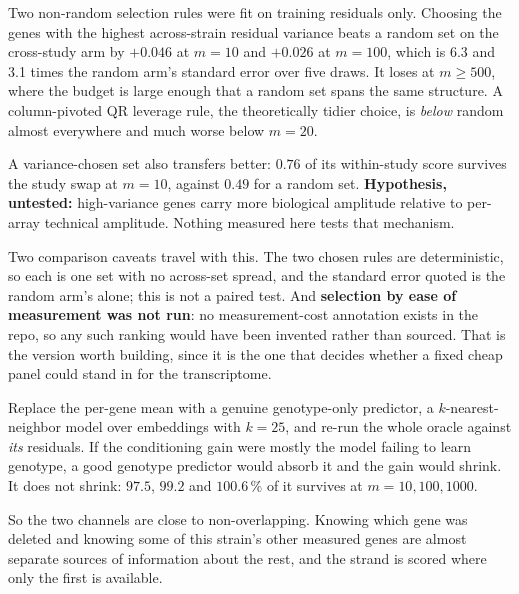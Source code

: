  Two
non-random selection rules were fit on training residuals only. Choosing the genes with the
highest across-strain residual variance beats a random set on the cross-study arm by
$+0.046$ at $m = 10$ and $+0.026$ at $m = 100$, which is 6.3 and 3.1 times the random arm's
standard error over five draws. It loses at $m \ge 500$, where the budget is large enough
that a random set spans the same structure. A column-pivoted QR leverage rule, the
theoretically tidier choice, is \emph{below} random almost everywhere and much worse below
$m = 20$.

A variance-chosen set also transfers better: $0.76$ of its within-study score survives the
study swap at $m = 10$, against $0.49$ for a random set. \textbf{Hypothesis, untested:}
high-variance genes carry more biological amplitude relative to per-array technical
amplitude. Nothing measured here tests that mechanism.

Two comparison caveats travel with this. The two chosen rules are deterministic, so each is
one set with no across-set spread, and the standard error quoted is the random arm's alone;
this is not a paired test. And \textbf{selection by ease of measurement was not run}: no
measurement-cost annotation exists in the repo, so any such ranking would have been invented
rather than sourced. That is the version worth building, since it is the one that decides
whether a fixed cheap panel could stand in for the transcriptome.

 Replace the per-gene mean with a genuine
genotype-only predictor, a $k$-nearest-neighbor model over  embeddings
with $k = 25$, and re-run the whole oracle against \emph{its} residuals. If the conditioning
gain were mostly the model failing to learn genotype, a good genotype predictor would absorb
it and the gain would shrink. It does not shrink: $97.5$, $99.2$ and $100.6\,\%$ of it
survives at $m = 10, 100, 1000$.

So the two channels are close to non-overlapping. Knowing which gene was deleted and knowing
some of this strain's other measured genes are almost separate sources of information about
the rest, and the strand is scored where only the first is available.

